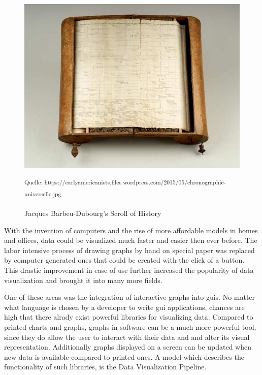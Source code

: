 \begin{figure}[h]
    \centering
    \includegraphics[width=12cm]{resources/img/ScrollOfHistory}
    \caption{Jacques Barbeu-Dubourg's Scroll of History}
    \small\textsuperscript{Quelle: https://earlyamericanists.files.wordpress.com/2015/05/chronographie-universelle.jpg}
    \label{fig:historyscroll}
\end{figure}

With the invention of computers and the rise of more affordable models in homes
and offices, data could be visualized much faster and easier then ever before.
The labor intensive process of drawing graphs by hand on special paper was
replaced by computer generated ones that could be created with the click of a
button. This drastic improvement in ease of use further increased the popularity
of data visualization and brought it into many more fields.
\cite{DataVisHistory2}

One of these areas was the integration of interactive graphs into \glspl{gui}.
No matter what language is chosen by a developer to write \gls{gui}
applications, chances are high that there alrady exist powerful libraries for
visualizing data. Compared to printed charts and graphs, graphs in software can
be a much more powerful tool, since they do allow the user to interact with
their data and and alter its visual representation. Additionally graphs
displayed on a screen can be updated when new data is available compared to
printed ones. A model which describes the functionality of such libraries, is
the Data Visualization Pipeline.  \cite{VisIdioms}





